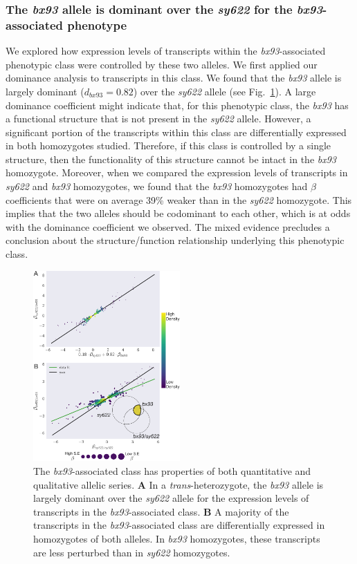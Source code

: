 \documentclass[10pt, twocolumn]{article}
\begin{document}
\subsubsection*{The \emph{bx93} allele is dominant over the \emph{sy622} for the
                \emph{bx93}-associated phenotype}
We explored how expression levels of transcripts within the
\emph{bx93}-associated phenotypic class were controlled by these two alleles.
We first applied our dominance analysis to transcripts in this class. We found
that the \emph{bx93} allele is largely dominant ($d_{bx93}=0.82$) over the \emph{sy622}
allele (see Fig.~\ref{fig:bx93_associated}). A large dominance coefficient might
indicate that, for this phenotypic class, the \emph{bx93} has a functional
structure that is not present in the \emph{sy622} allele. However, a significant
portion of the transcripts within this class are differentially
expressed in both homozygotes studied. Therefore, if this class is
controlled by a single structure, then the functionality of this structure cannot
be intact in the \emph{bx93} homozygote. Moreover, when we compared the expression
levels of transcripts in \emph{sy622} and \emph{bx93} homozygotes, we found that
the \emph{bx93} homozygotes had $\beta$ coefficients that were on average
39\% weaker than in the \emph{sy622} homozygote. This implies that the
two alleles should be codominant to each other, which is at odds with the
dominance coefficient we observed. The mixed evidence precludes a conclusion
about the structure/function relationship underlying this phenotypic class.

\begin{figure}
  \centering{}
  \includegraphics[width=0.5\textwidth]{../figs/bx93_associated_analysis.pdf}
  \caption{The \emph{bx93}-associated class has properties of both quantitative
    and qualitative allelic series.
    \textbf{A} In a \emph{trans}-heterozygote, the \emph{bx93} allele is largely
    dominant over the \emph{sy622} allele for the expression levels of
    transcripts in the \emph{bx93}-associated class.
    \textbf{B} A majority of the transcripts in the \emph{bx93}-associated class
    are differentially expressed in homozygotes of both alleles. In \emph{bx93}
    homozygotes, these transcripts are less perturbed than in \emph{sy622}
    homozygotes.
    }
\label{fig:bx93_associated}
\end{figure}
\end{document}

